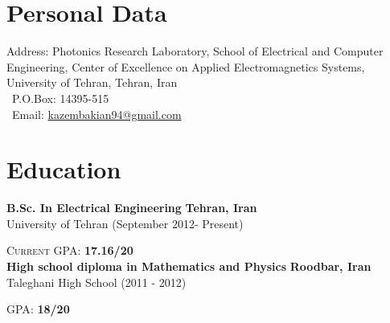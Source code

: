 \documentclass[a4paper,10pt]{article} %
\begin{document}
		\par{\bigskip\par}

	





\color{blue}
\section{Personal Data}


\color{black}
Address: Photonics Research Laboratory, School of Electrical and Computer Engineering, Center of Excellence on Applied  Electromagnetics Systems, University of Tehran, Tehran, Iran\\
\ P.O.Box: 14395-515 \\
\ Email: \href{mailto:kazembakian94@gmail.com}{kazembakian94@gmail.com}
\color{blue}
\section{Education}
\color{Black}


	{\bf B.Sc. In Electrical Engineering} \hfill {\bf Tehran, Iran}\\
	 {University of Tehran}  \hfill (September 2012- Present)
	 	
	{\normalsize\textsc{Current GPA}: {\bf 17.16/20 }}\\

	
	{\bf High school diploma in Mathematics and Physics} \hfill {\bf Roodbar, Iran}\\
	{Taleghani High School } \hfill (2011 - 2012)

	\normalsize\textsc{GPA}: \textbf{18/20}

\color{blue}
\end{document}
